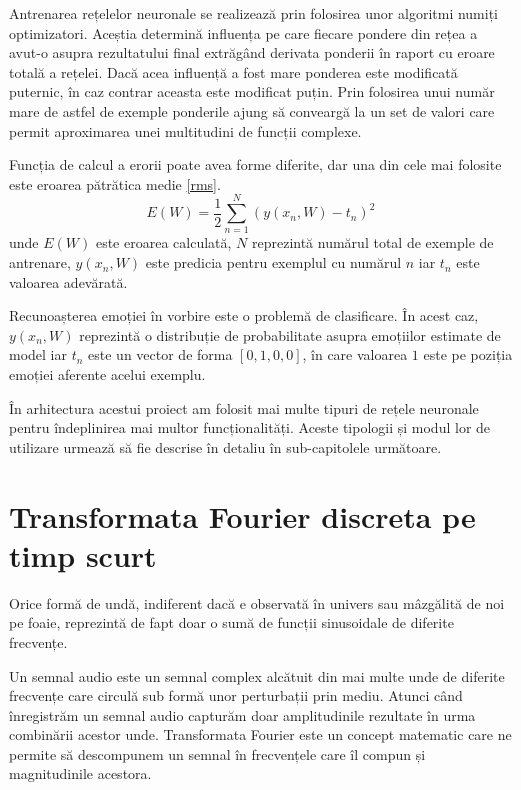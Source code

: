\documentclass[a4paper,12pt]{book}
\begin{document}
			Antrenarea rețelelor neuronale se realizează prin folosirea unor algoritmi numiți optimizatori. Aceștia determină influența pe care fiecare pondere din rețea a avut-o asupra rezultatului final extrăgând derivata ponderii în raport cu eroare totală a rețelei. Dacă acea influență a fost mare ponderea este modificată puternic, în caz contrar aceasta este modificat puțin. Prin folosirea unui număr mare de astfel de exemple ponderile ajung să conveargă la un set de valori care permit aproximarea unei multitudini de funcții complexe. \par
			
			Funcția de calcul a erorii poate avea forme diferite, dar una din cele mai folosite este eroarea pătrătica medie \ref{rms}.
			\begin{equation} \label{rms}
				E(W) = \frac{1}{2} \sum_{n=1}^{N} (y(x_n, W) - t_n)^2
			\end{equation}
			unde $E(W)$ este eroarea calculată, $N$ reprezintă numărul total de exemple de antrenare, $y(x_n, W)$ este predicia pentru exemplul cu numărul $n$ iar $t_n$ este valoarea adevărată. \par
			
			Recunoașterea emoției în vorbire este o problemă de clasificare. În acest caz, $y(x_n, W)$ reprezintă o distribuție de probabilitate asupra emoțiilor estimate de model iar $t_n$ este un vector de forma $[0,1,0,0]$, în care valoarea $1$ este pe poziția emoției aferente acelui exemplu. \par
			
			În arhitectura acestui proiect am folosit mai multe tipuri de rețele neuronale pentru îndeplinirea mai multor funcționalități. Aceste tipologii și modul lor de utilizare urmează să fie descrise în detaliu în sub-capitolele următoare.
			\section{Transformata Fourier discreta pe timp scurt} 
			
			Orice formă de undă, indiferent dacă e observată în univers sau mâzgălită de noi pe foaie, reprezintă de fapt doar o sumă de funcții sinusoidale de diferite frecvențe.\par
			
			Un semnal audio este un semnal complex alcătuit din mai multe unde de diferite frecvențe care circulă sub formă unor perturbații prin mediu. Atunci când înregistrăm un semnal audio capturăm doar amplitudinile rezultate în urma combinării acestor unde. Transformata Fourier este un concept matematic care ne permite să descompunem un semnal în frecvențele care îl compun și magnitudinile acestora.\par 
			
\end{document}
